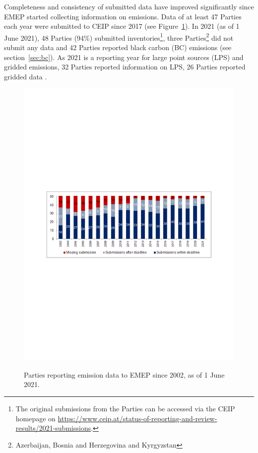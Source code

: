 Completeness and consistency of submitted data have improved significantly since EMEP started collecting information on emissions. Data of at least 47 Parties each year were submitted to CEIP since 2017 (see Figure~\ref{fig:CEIP1}). In 2021 (as of 1 June 2021), 48 Parties (94\%) submitted inventories\footnote{The original submissions from the Parties can be accessed via the CEIP homepage on \url{https://www.ceip.at/status-of-reporting-and-review-results/2021-submissions}.}, three Parties\footnote{Azerbaijan, Bosnia and Herzegovina and Kyrgyzstan} did not submit any data and 42 Parties reported black carbon (BC) emissions (see section~\ref{sec:bc}). As 2021 is a reporting year for large point sources (LPS) and gridded emissions, 32 Parties reported information on LPS, 26 Parties reported gridded data  \citep{CEIP2021}.

\begin{figure}[h]
\centering
{\includegraphics*[viewport=60 295 550 500,clip,scale=0.75]{FIGS_CEIP/Fig1.pdf}}
\caption{Parties reporting emission data to EMEP since 2002, as of 1 June 2021.}
\label{fig:CEIP1}
\end{figure}

